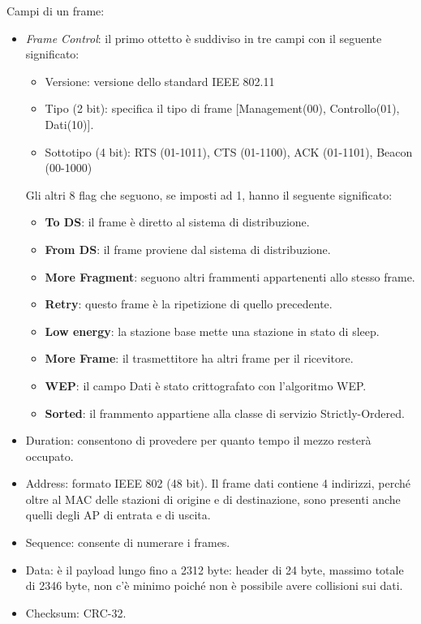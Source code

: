             Campi di un frame:
            \begin{itemize}
                \item \textit{Frame Control}: il primo ottetto è suddiviso in tre campi con il seguente significato:
                \begin{itemize}
                    \item Versione: versione dello standard IEEE 802.11
                    \item Tipo (2 bit): specifica il tipo di frame [Management(00), Controllo(01), Dati(10)].
                    \item Sottotipo (4 bit): RTS (01-1011), CTS (01-1100), ACK (01-1101), Beacon (00-1000)
                \end{itemize}
                Gli altri 8 flag che seguono, se imposti ad 1, hanno il seguente significato:
                \begin{itemize}
                    \item \textbf{To DS}: il frame è diretto al sistema di distribuzione.
                    \item \textbf{From DS}: il frame proviene dal sistema di distribuzione.
                    \item \textbf{More Fragment}: seguono altri frammenti appartenenti allo stesso frame.
                    \item \textbf{Retry}: questo frame è la ripetizione di quello precedente.
                    \item \textbf{Low energy}: la stazione base mette una stazione in stato di sleep.
                    \item \textbf{More Frame}: il trasmettitore ha altri frame per il ricevitore.
                    \item \textbf{WEP}: il campo Dati è stato crittografato con l'algoritmo WEP.
                    \item \textbf{Sorted}: il frammento appartiene alla classe di servizio Strictly-Ordered.
                \end{itemize}
                \item Duration: consentono di provedere per quanto tempo il mezzo resterà occupato.
                \item Address: formato IEEE 802 (48 bit). Il frame dati contiene 4 indirizzi, perché oltre al MAC delle stazioni di origine e di destinazione, sono presenti anche quelli degli AP di entrata e di uscita.
                \item Sequence: consente di numerare i frames.
                \item Data: è il payload lungo fino a 2312 byte: header di 24 byte, massimo totale di 2346 byte, non c'è minimo poiché non è possibile avere collisioni sui dati.
                \item Checksum: CRC-32.
            \end{itemize}

